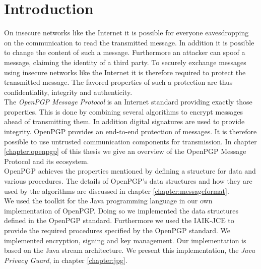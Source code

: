 \chapter{Introduction}



On insecure networks like the Internet it is possible for everyone eavesdropping on the communication to read the transmitted message. In addition it is possible to change the content of such a message. Furthermore an attacker can spoof a message, claiming the identity of a third party.
To securely exchange messages using insecure networks like the Internet it is therefore required to protect the transmitted message. The favored properties of such a protection are thus confidentiality, integrity and authenticity. \\


The \textit{OpenPGP Message Protocol} is an Internet standard providing exactly those properties.  This is done by combining several algorithms to encrypt messages ahead of transmitting them. In addition digital signatures are used to provide integrity. OpenPGP provides an end-to-end protection of messages. It is therefore possible to use untrusted communication components for transmission.
In chapter \ref{chapter:openpgp} of this thesis we give an overview of the OpenPGP Message Protocol and its ecosystem. \\

OpenPGP achieves the properties mentioned by defining a structure for data and various procedures. The details of OpenPGP's data structures and how they are used by the algorithms are discussed in chapter \ref{chapter:messageformat}. \\


We used the  toolkit for the Java programming language in our own implementation of OpenPGP. Doing so we implemented the data structures defined in the OpenPGP standard. Furthermore we used the IAIK-JCE to provide the required procedures specified by the OpenPGP standard. We implemented encryption, signing and key management. Our implementation is based on the Java stream architecture. We present this implementation, the \textit{Java Privacy Guard}, in chapter \ref{chapter:jpg}. \\

